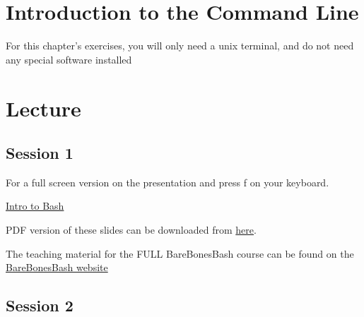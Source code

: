 \documentclass[
  letterpaper,
]{book}
\begin{document}
\hypertarget{introduction-to-the-command-line}{%
\chapter{Introduction to the Command
Line}\label{introduction-to-the-command-line}}

\begin{tcolorbox}[enhanced jigsaw, opacitybacktitle=0.6, bottomtitle=1mm, opacityback=0, colback=white, coltitle=black, leftrule=.75mm, toprule=.15mm, title=\textcolor{quarto-callout-tip-color}{\faLightbulb}\hspace{0.5em}{Tip}, colframe=quarto-callout-tip-color-frame, toptitle=1mm, arc=.35mm, left=2mm, titlerule=0mm, breakable, rightrule=.15mm, bottomrule=.15mm, colbacktitle=quarto-callout-tip-color!10!white]

For this chapter's exercises, you will only need a unix terminal, and do
not need any special software installed

\end{tcolorbox}

\hypertarget{lecture-5}{%
\chapter{Lecture}\label{lecture-5}}

\hypertarget{session-1}{%
\section{Session 1}\label{session-1}}

For a full screen version on the presentation and press f on your
keyboard.

\href{https://spaam-community.github.io/wss-summer-school/assets/slides/2022/1bc-barebonesbash/bbb1/session1.html}{Intro
to Bash}

PDF version of these slides can be downloaded from
\href{https://raw.githubusercontent.com/SPAAM-community/wss-summer-school/main/docs/assets/slides/2022/1bc-barebonesbash/SPAAM\%20Summer\%20School\%202022\%20-\%201B\%20-\%20BareBonesBash\%201.pdf}{here}.

The teaching material for the FULL BareBonesBash course can be found on
the \href{https://barebonesbash.github.io/}{BareBonesBash website}

\hypertarget{session-2}{%
\section{Session 2}\label{session-2}}
\end{document}
